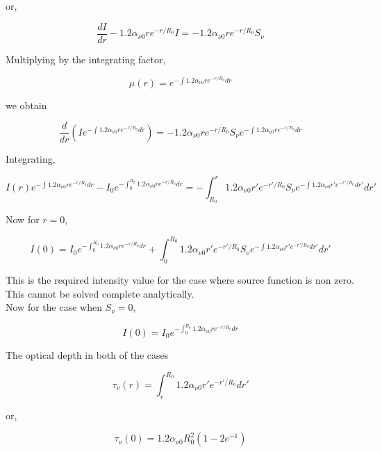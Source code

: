 \documentclass{article}
\begin{document}
or,

\begin{equation}
\frac{dI}{dr}-1.2\alpha_{\nu0} r e^{-r/R_0} I
=
-1.2\alpha_{\nu0} r e^{-r/R_0} S_\nu
\end{equation}

Multiplying by the integrating factor,

\begin{equation}
\mu(r)=e^{-\int1.2\alpha_{\nu0} r e^{-r/R_0} dr}
\end{equation}

we obtain

\begin{equation}
\frac{d}{dr}
\left(
I e^{-\int1.2\alpha_{\nu0} r e^{-r/R_0} dr}
\right)
=
-1.2\alpha_{\nu0} r e^{-r/R_0} S_\nu
e^{-\int1.2\alpha_{\nu0} r e^{-r/R_0} dr}
\end{equation}

Integrating,

\begin{equation}
I(r)e^{-\int1.2\alpha_{\nu0} r e^{-r/R_0} dr}
-
I_0 e^{-\int_{0}^{R_0}1.2\alpha_{\nu0} r e^{-r/R_0} dr}
=
-
\int_{R_0}^{r}
1.2\alpha_{\nu0} r' e^{-r'/R_0} S_\nu
e^{-\int1.2\alpha_{\nu0} r' e^{-r'/R_0} dr'} dr'
\end{equation}

Now for $r=0$,

\begin{equation}
\boxed{
I(0)
=
I_0 e^{-\int_{0}^{R_0}1.2\alpha_{\nu0} r e^{-r/R_0} dr}
+
\int_0^{R_0}
1.2\alpha_{\nu0} r' e^{-r'/R_0} S_\nu
e^{-\int1.2\alpha_{\nu0} r' e^{-r'/R_0} dr'} dr'
}
\end{equation}

This is the required intensity value for the case where source function is non zero.
This cannot be solved complete analytically.\\

Now for the case when $S_\nu=0$,

\begin{equation}
\boxed{
I(0)=I_0 e^{-\int_{0}^{R_0}1.2\alpha_{\nu0} r e^{-r/R_0} dr}
}
\end{equation}

The optical depth in both of the cases

\begin{equation}
\tau_\nu(r)=\int_r^{R_0}1.2\alpha_{\nu0} r' e^{-r'/R_0} dr'
\end{equation}

or,

\begin{equation}
\boxed{
\tau_\nu(0)=1.2\alpha_{\nu0}R_0^2(1-2e^{-1})
}
\end{equation}
\end{document}
